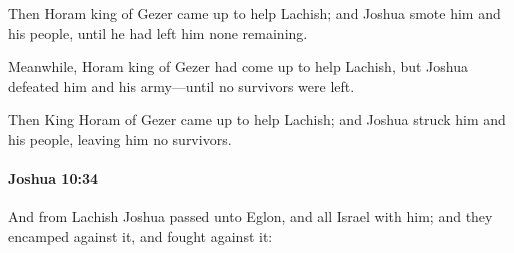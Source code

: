 			\begin{versebox}
					\item[BHS] 
					\item[ASV] Then Horam king of Gezer came up to help Lachish; and Joshua smote him and his people, until he had left him none remaining.
					\item[NIV] Meanwhile, Horam king of Gezer had come up to help Lachish, but Joshua defeated him and his army—until no survivors were left.
					\item[NRSV] Then King Horam of Gezer came up to help Lachish; and Joshua struck him and his people, leaving him no survivors.
			\end{versebox}

		\paragraph{Joshua 10:34} %
			\label{JOSHUA-10-34}

			And from Lachish Joshua passed unto Eglon, and all Israel with him; and they encamped against it, and fought against it:


